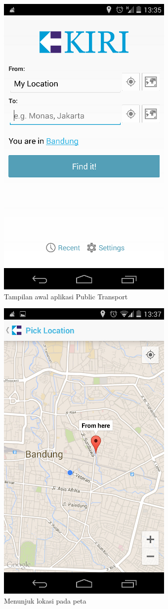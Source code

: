\begin{figure}[h]
	\centering
		\includegraphics[scale=0.5]{Gambar/KIRI_Android/home}
	\caption{Tampilan awal aplikasi Public Transport}
	\label{fig:home}
\end{figure}

\begin{figure}[h]
	\centering
		\includegraphics[scale=0.5]{Gambar/KIRI_Android/menunjuk_lokasi}
	\caption{Menunjuk lokasi pada peta}
	\label{fig:menunjuk}
\end{figure}

